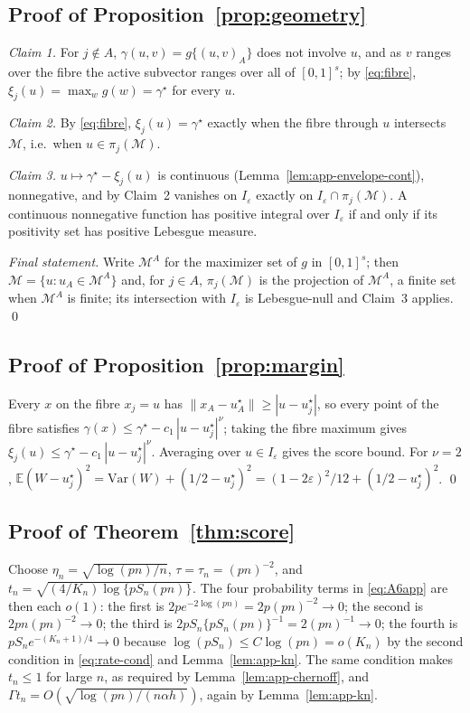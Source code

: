 \documentclass[bj,authoryear]{imsart}
\theoremstyle{plain}
\newcommand{\A}{A}\newcommand{\I}{I_\varepsilon}
\newcommand{\M}{\mathcal{M}}\newcommand{\Pp}{\mathbb P}
\newcommand{\E}{\mathbb E}\newcommand{\R}{\mathbb R}
\newcommand{\gmax}{\gamma^\star}
\begin{document}
\begin{appendix}
\subsection{Proof of Proposition~\ref{prop:geometry}}

\emph{Claim 1.}  For $j\notin\A$, $\gamma(u,v)=g\{(u,v)_{\A}\}$ does not
involve $u$, and as $v$ ranges over the fibre the active subvector ranges
over all of $[0,1]^{s}$; by \eqref{eq:fibre},
$\xi_j(u)=\max_{w}g(w)=\gmax$ for every $u$.

\emph{Claim 2.}  By \eqref{eq:fibre}, $\xi_j(u)=\gmax$ exactly when the
fibre through $u$ intersects $\M$, i.e.\ when $u\in\pi_j(\M)$.

\emph{Claim 3.}  $u\mapsto\gmax-\xi_j(u)$ is continuous
(Lemma~\ref{lem:app-envelope-cont}), nonnegative, and by Claim~2 vanishes
on $\I$ exactly on $\I\cap\pi_j(\M)$.  A continuous nonnegative function
has positive integral over $\I$ if and only if its positivity set has
positive Lebesgue measure.

\emph{Final statement.}  Write $\M^{\A}$ for the maximizer set of $g$ in
$[0,1]^{s}$; then $\M=\{u:u_{\A}\in\M^{\A}\}$ and, for $j\in\A$,
$\pi_j(\M)$ is the projection of $\M^{\A}$, a finite set when $\M^{\A}$ is
finite; its intersection with $\I$ is Lebesgue-null and Claim~3 applies.
\qed

\subsection{Proof of Proposition~\ref{prop:margin}}

Every $x$ on the fibre $x_j=u$ has
$\|x_{\A}-u^\star_{\A}\|\ge|u-u^\star_j|$, so every point of the fibre
satisfies
$\gamma(x)\le\gmax-c_1\,|u-u^\star_j|^\nu$; taking the fibre maximum
gives $\xi_j(u)\le\gmax-c_1\,|u-u^\star_j|^\nu$.  Averaging
over $u\in\I$ gives the score bound.  For $\nu=2$,
$\E(W-u_j^\star)^2=\mathrm{Var}(W)+(1/2-u_j^\star)^2
=(1-2\varepsilon)^2/12+(1/2-u_j^\star)^2$.  \qed

\subsection{Proof of Theorem~\ref{thm:score}}

Choose $\eta_n=\sqrt{\log(pn)/n}$, $\tau=\tau_n=(pn)^{-2}$, and
$t_n=\sqrt{(4/K_n)\log\{pS_n(pn)\}}$.  The four probability terms in
\eqref{eq:A6app} are then each $o(1)$: the first is
$2pe^{-2\log(pn)}=2p(pn)^{-2}\to0$; the second is $2pn(pn)^{-2}\to0$; the
third is $2pS_n\{pS_n(pn)\}^{-1}=2(pn)^{-1}\to0$; the fourth is
$pS_ne^{-(K_n+1)/4}\to0$ because $\log(pS_n)\le C\log(pn)=o(K_n)$ by the
second condition in \eqref{eq:rate-cond} and
Lemma~\ref{lem:app-kn}.  The same condition makes $t_n\le1$ for large
$n$, as required by Lemma~\ref{lem:app-chernoff}, and
$\Gamma t_n=O(\sqrt{\log(pn)/(n\alpha h)})$, again by
Lemma~\ref{lem:app-kn}.


\end{appendix}
\end{document}
